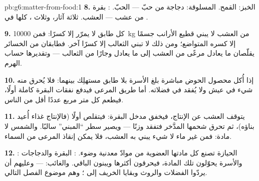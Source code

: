 \begin{solution}{pb:g6:matter-from-food:1}
\textbf{8.} الخبز:   القمح.  المسلوقة: دجاجة من
حبّ ---   الحبّ. : بقرة من عشب ---  العشب.
ثلاثة آثار، وثلاث ، كلها في .

\textbf{9.} كل طابق لا يمرّر إلا كسرًا: فمن \qty{10000}{kg} من
العشب لا يبني قطيع الأرانب جسمًا إلا كسره المتواضع؛ ومن ذلك لا
تبني الثعالب إلا كسرًا آخر. فطابقان من الخسائر يقلّصان ما يعادل
مرعًى من العشب إلى ما يعادل وجارًا من الثعالب --- وتقديرها حساب
الهرم.

\textbf{10.} إذا أُكل محصول الحوض مباشرة بلغ الأسرة بلا طابق
مستهلِك بينهما: فلا يُحرق منه شيء في عيش  ولا يُفقد في
فضلاته. أما طريق المرعى فيدفع نفقات البقرة كاملة أولًا، فيطعم كل
متر مربع عددًا أقل من الناس.

\textbf{11.} يتوقف العشب عن الإنتاج، فيخفق مدخل البقرة: فيتقلص
 أولًا (فالإنتاج غذاء أُعيد بناؤه)، ثم تحرق شحمها المدَّخر
فتفقد وزنًا --- ويصير سطر ``المبني'' سالبًا. والشمس  لا مادة:
فمن غير ماء لا شيء يبني به العشب، فلا يمكن إنقاذ المرعى من
السماء.

\textbf{12.} :  الحيازة تصنع كل مادتها العضوية من
موادّ معدنية وضوء. : البقرة والدجاجات والأسرة يحوّلون
تلك المادة، فيحرقون أكثرها ويبنون الباقي. والغائب:  ---
وعليهم أن يردّوا الفضلات والروث وبقايا الخريف إلى ؛ وهم
موضوع الفصل التالي.
\end{solution}
